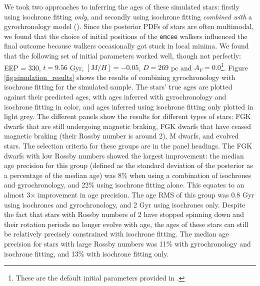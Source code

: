 We took two approaches to inferring the ages of these simulated stars:
firstly using isochrone fitting {\it only}, and secondly using isochrone
fitting {\it combined with} a gyrochronology model (\sd).
Since the posterior PDFs of stars are often multimodal, we found that the
choice of initial positions of the {\tt emcee} walkers influenced the final
outcome because walkers occasionally got stuck in local minima.
We found that the following set of initial parameters worked well, though not
perfectly: EEP = 330, $t = 9.56$ Gyr, $[M/H] = -0.05$, $D = 269$ pc and $A_V =
0.0$\footnote{These are the default initial parameters provided in \sd.}.
Figure \ref{fig:simulation_results} shows the results of combining
gyrochronology with isochrone fitting for the simulated sample.
The stars' true ages are plotted against their predicted ages, with ages
inferred with gyrochronology and isochrone fitting
in color, and ages inferred using isochrone fitting only plotted in light
grey.
The different panels show the results for different types of stars: FGK
dwarfs that are still undergoing magnetic braking, FGK dwarfs that have ceased
magnetic braking (their Rossby number is around 2), M dwarfs, and evolved
stars.
The selection criteria for these groups are in the panel headings.
The FGK dwarfs with low Rossby numbers showed the largest improvement: the
median age precision for this group (defined as the standard deviation of the
posterior as a percentage of the median age) was 8\% when using a combination
of isochrones and gyrochronology, and 22\% using isochrone fitting alone.
This equates to an almost 3$\times$ improvement in age precision.
The age RMS of this group was 0.8 Gyr using isochrones and gyrochronology, and
2 Gyr using isochrones only.
Despite the fact that stars with Rossby numbers of 2 have stopped spinning
down and their rotation periods no longer evolve with age, the ages of these
stars can still be relatively precisely constrained with isochrone fitting.
The median age precision for stars with large Rossby numbers was 11\% with
gyrochronology and isochrone fitting, and 13\% with isochrone fitting only.
